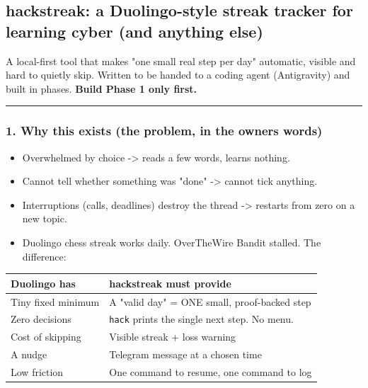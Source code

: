 \hypertarget{hackstreak-spec-hackstreak-a-duolingo-style-streak-tracker-for-learning-cyber-and-anything-else}{%
\subsection{hackstreak: a Duolingo-style streak tracker for learning
cyber (and anything
else)}\label{hackstreak-spec-hackstreak-a-duolingo-style-streak-tracker-for-learning-cyber-and-anything-else}}

A local-first tool that makes "one small real step per day" automatic,
visible and hard to quietly skip. Written to be handed to a coding agent
(Antigravity) and built in phases. \textbf{Build Phase 1 only first.}

\begin{center}\rule{0.5\linewidth}{0.5pt}\end{center}

\hypertarget{hackstreak-spec-1-why-this-exists-the-problem-in-the-owners-words}{%
\subsubsection{1. Why this exists (the problem, in the
owner\textquotesingle s
words)}\label{hackstreak-spec-1-why-this-exists-the-problem-in-the-owners-words}}

\begin{itemize}
\tightlist
\item
  Overwhelmed by choice -\textgreater{} reads a few words, learns
  nothing.
\item
  Cannot tell whether something was "done" -\textgreater{} cannot tick
  anything.
\item
  Interruptions (calls, deadlines) destroy the thread -\textgreater{}
  restarts from zero on a new topic.
\item
  Duolingo chess streak works daily. OverTheWire Bandit stalled. The
  difference:
\end{itemize}

\begin{longtable}[]{@{}P{.36\textwidth}P{.59\textwidth}@{}}
\toprule\noalign{}
Duolingo has & hackstreak must provide \\
\midrule\noalign{}
\endhead
\bottomrule\noalign{}
\endlastfoot
Tiny fixed minimum & A "valid day" = ONE small, proof-backed step \\
Zero decisions & \texttt{hack} prints the single next step. No menu. \\
Cost of skipping & Visible streak + loss warning \\
A nudge & Telegram message at a chosen time \\
Low friction & One command to resume, one command to log \\
\end{longtable}

